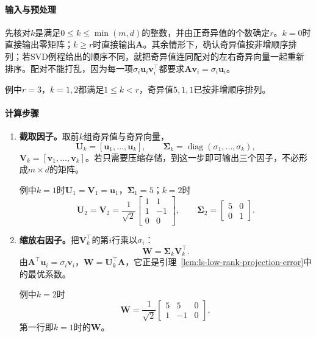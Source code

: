 \paragraph{输入与预处理}
先核对$k$是满足$0\leq k\leq\min(m,d)$的整数，并由正奇异值的个数确定$r$。$k=0$时直接输出零矩阵；$k\geq r$时直接输出$\bm A$。其余情形下，确认奇异值按非增顺序排列；若SVD例程给出的顺序不同，就把奇异值连同配对的左右奇异向量一起重新排序。配对不能打乱，因为每一项$\sigma_i\bm u_i\bm v_i^\top$都要求$\bm A\bm v_i=\sigma_i\bm u_i$。

例中$r=3$，$k=1,2$都满足$1\leq k<r$，奇异值$5,1,1$已按非增顺序排列。

\paragraph{计算步骤}
\begin{enumerate}
 \item \textbf{截取因子。}取前$k$组奇异值与奇异向量，
 \[
  \bm U_k=[\bm u_1,\ldots,\bm u_k],\qquad
  \bm\Sigma_k=\operatorname{diag}(\sigma_1,\ldots,\sigma_k),
 \]
 $\bm V_k=[\bm v_1,\ldots,\bm v_k]$。若只需要压缩存储，到这一步即可输出三个因子，不必形成$m\times d$的矩阵。

 例中$k=1$时$\bm U_1=\bm V_1=\bm u_1$，$\bm\Sigma_1=5$；$k=2$时
 \[
  \bm U_2=\bm V_2=\frac1{\sqrt2}\begin{bmatrix}1&1\\1&-1\\0&0\end{bmatrix},\qquad
  \bm\Sigma_2=\begin{bmatrix}5&0\\0&1\end{bmatrix}.
 \]

 \item \textbf{缩放右因子。}把$\bm V_k^\top$的第$i$行乘以$\sigma_i$：
 \begin{equation}
  \bm W=\bm\Sigma_k\bm V_k^\top .
  \label{eq:ls-truncated-svd-coefficients}
 \end{equation}
 由$\bm A^\top\bm u_i=\sigma_i\bm v_i$，$\bm W=\bm U_k^\top\bm A$，它正是引理~\ref{lem:ls-low-rank-projection-error}中的最优系数。

 例中$k=2$时
 \[
  \bm W=\frac1{\sqrt2}\begin{bmatrix}5&5&0\\1&-1&0\end{bmatrix},
 \]
 第一行即$k=1$时的$\bm W$。


\end{enumerate}
